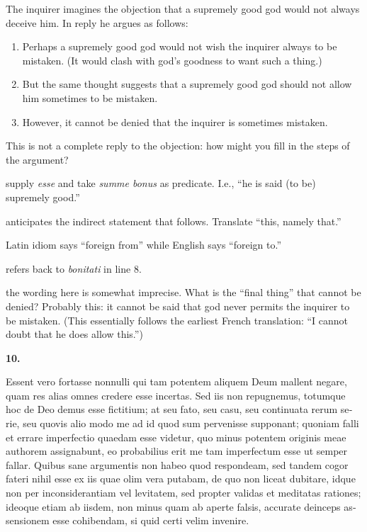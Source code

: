  The inquirer imagines the objection that a supremely good god would not always deceive him. In reply he argues as follows:

\begin{enumerate}
    \item Perhaps a supremely good god would not wish the inquirer always to be mistaken. (It would clash with god's goodness to want such a thing.)
    \item But the same thought suggests that a supremely good god should not allow him sometimes to be mistaken.
    \item However, it cannot be denied that the inquirer is sometimes mistaken.
\end{enumerate}

This is not a complete reply to the objection: how might you fill in the steps of the argument?

 supply \textit{esse} and take \textit{summe bonus} as predicate. I.e., ``he is said (to be) supremely good.''

 anticipates the indirect statement that follows. Translate ``this, namely that.''

 Latin idiom says ``foreign from'' while English says ``foreign to.''

 refers back to \textit{bonitati} in line 8.

 the wording here is somewhat imprecise. What is the ``final thing'' that cannot be denied? Probably this: it cannot be said that god never permits the inquirer to be mistaken. (This essentially follows the earliest French translation: ``I cannot doubt that he does allow this.'')

\clearpage

\beginnumbering
\pstart
\textbf{10.} \begin{latin}Essent vero fortasse nonnulli qui tam potentem aliquem Deum mallent negare, quam res alias omnes credere esse incertas. Sed iis non repugnemus, totumque hoc de Deo demus esse fictitium; at seu fato, seu casu, seu continuata rerum serie, seu quovis alio modo me ad id quod sum pervenisse supponant; quoniam falli et errare imperfectio quaedam esse videtur, quo minus potentem originis meae authorem assignabunt, eo probabilius erit me tam imperfectum esse ut semper fallar. Quibus sane argumentis non habeo quod respondeam, sed tandem cogor fateri nihil esse ex iis quae olim vera putabam, de quo non liceat dubitare, idque non per inconsiderantiam vel levitatem, sed propter validas et meditatas rationes; ideoque etiam ab iisdem, non minus quam ab aperte falsis, accurate deinceps assensionem esse cohibendam, si quid certi velim invenire.\end{latin}
\pend
\endnumbering


